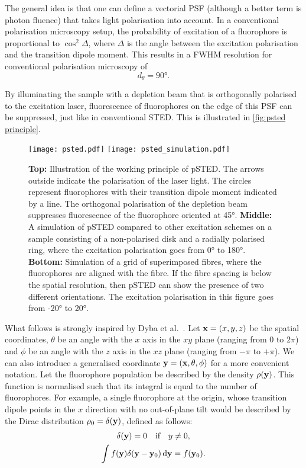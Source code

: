 The general idea is that one can define a vectorial PSF (although a better term is photon fluence) that takes light polarisation into account. In a conventional polarisation microscopy setup, the probability of excitation of a fluorophore is proportional to $ \cos^2 \Delta $, where $ \Delta $ is the angle between the excitation polarisation and the transition dipole moment. This results in a FWHM resolution for conventional polarisation microscopy of 
\begin{equation}
	d_\theta = \ang{90}.
\end{equation}

By illuminating the sample with a depletion beam that is orthogonally polarised to the excitation laser, fluorescence of fluorophores on the edge of this PSF can be suppressed, just like in conventional STED. This is illustrated in \autoref{fig:psted principle}.

\begin{figure}
	\centering
	\texttt{[image: psted.pdf]}
	\texttt{[image: psted\_simulation.pdf]}
	\caption{
		\textbf{Top:} Illustration of the working principle of pSTED. The arrows outside indicate the polarisation of the laser light. The circles represent fluorophores with their transition dipole moment indicated by a line. The orthogonal polarisation of the depletion beam suppresses fluorescence of the fluorophore oriented at \ang{45}.
		\textbf{Middle:} A simulation of pSTED compared to other excitation schemes on a sample consisting of a non-polarised disk and a radially polarised ring, where the excitation polarisation goes from \ang{0} to \ang{180}.
		\textbf{Bottom:} Simulation of a grid of superimposed fibres, where the fluorophores are aligned with the fibre. If the fibre spacing is below the spatial resolution, then pSTED can show the presence of two different orientations. The excitation polarisation in this figure goes from \ang{-20} to \ang{+20}.
	}
	\label{fig:psted principle}
\end{figure}

What follows is strongly inspired by Dyba et al.~\cite{Dyba2005}. Let $ \vb{x} = (x, y, z)$ be the spatial coordinates, $ \theta $ be an angle with the $ x $ axis in the $ xy $ plane (ranging from $ 0 $ to $ 2\pi$) and $ \phi $ be an angle with the $ z $ axis in the $ xz $ plane (ranging from $ -\pi$ to $+\pi$). We can also introduce a generalised coordinate $ \vb{y} = (\vb{x}, \theta, \phi) $ for a more convenient notation.
Let the fluorophore population be described by the density $ \rho(\vb{y}) $. This function is normalised such that its integral is equal to the number of fluorophores. For example, a single fluorophore at the origin, whose transition dipole points in the $ x $ direction with no out-of-plane tilt would be described by the Dirac distribution $ \rho_0 = \delta(\vb{y}) $, defined as follows:
\begin{gather}
	\delta(\vb{y}) = 0 \qq{if} y\neq0, \\
	\int f(\vb{y})\delta(\vb{y}-\vb{y}_0) \dd{\vb{y}} = f(\vb{y}_0).
\end{gather}

